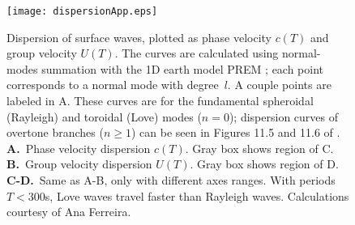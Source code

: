 \begin{figure}
\centering
\texttt{[image: dispersionApp.eps]}
\caption[Dispersion of surface waves]
{{
Dispersion of surface waves, plotted as phase velocity $c(T)$ and group velocity $U(T)$. The curves are calculated using normal-modes summation with the 1D earth model PREM \citep{PREM}; each point corresponds to a normal mode with
degree~$l$.
A couple points are labeled in A. These curves are for the fundamental spheroidal (Rayleigh) and toroidal (Love) modes ($n = 0$); dispersion curves of overtone branches ($n \ge 1$)  can be seen in Figures 11.5 and 11.6 of \citet{DT}.
{\bf A.}~Phase velocity dispersion $c(T)$. Gray box shows region of C.
{\bf B.}~Group velocity dispersion $U(T)$. Gray box shows region of D.
{\bf C-D.}~Same as A-B, only with different axes ranges.
With periods $T<300$s, Love waves travel faster than Rayleigh waves.
Calculations courtesy of Ana Ferreira.
}}
\label{fig:dispersionApp}
\end{figure}
